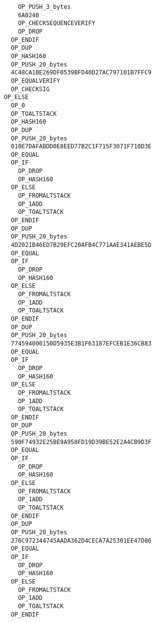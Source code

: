 \begin{lstlisting}
                       OP_PUSH_3_bytes
                       6A0240
                       OP_CHECKSEQUENCEVERIFY
                       OP_DROP
                     OP_ENDIF
                     OP_DUP
                     OP_HASH160
                     OP_PUSH_20_bytes
                     4C48CA1BE269DF0539BFD40D27AC797101B7FFC9
                     OP_EQUALVERIFY
                     OP_CHECKSIG
                   OP_ELSE
                     OP_0
                     OP_TOALTSTACK
                     OP_HASH160
                     OP_DUP
                     OP_PUSH_20_bytes
                     010E7DAFABDD0E8EED77B2C1F715F3071F710D3E
                     OP_EQUAL
                     OP_IF
                       OP_DROP
                       OP_HASH160
                     OP_ELSE
                       OP_FROMALTSTACK
                       OP_1ADD
                       OP_TOALTSTACK
                     OP_ENDIF
                     OP_DUP
                     OP_PUSH_20_bytes
                     4D2021B46ED7B29EFC20AFB4C771AAE341AEBE5D
                     OP_EQUAL
                     OP_IF
                       OP_DROP
                       OP_HASH160
                     OP_ELSE
                       OP_FROMALTSTACK
                       OP_1ADD
                       OP_TOALTSTACK
                     OP_ENDIF
                     OP_DUP
                     OP_PUSH_20_bytes
                     774594000150D5935E3B1F63187EFCEB1E36CB83
                     OP_EQUAL
                     OP_IF
                       OP_DROP
                       OP_HASH160
                     OP_ELSE
                       OP_FROMALTSTACK
                       OP_1ADD
                       OP_TOALTSTACK
                     OP_ENDIF
                     OP_DUP
                     OP_PUSH_20_bytes
                     590F74932E25BE9A958FD19D39BE52E2A4CB9D3F
                     OP_EQUAL
                     OP_IF
                       OP_DROP
                       OP_HASH160
                     OP_ELSE
                       OP_FROMALTSTACK
                       OP_1ADD
                       OP_TOALTSTACK
                     OP_ENDIF
                     OP_DUP
                     OP_PUSH_20_bytes
                     276C972344745AADA362D4CECA7A25301EE47D86
                     OP_EQUAL
                     OP_IF
                       OP_DROP
                       OP_HASH160
                     OP_ELSE
                       OP_FROMALTSTACK
                       OP_1ADD
                       OP_TOALTSTACK
                     OP_ENDIF

\end{lstlisting}
